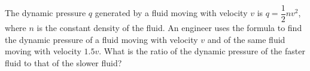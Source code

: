 The dynamic pressure $q$ generated by a fluid moving with velocity $v$ is $q=\dfrac{1}{2}nv^2$, where $n$ is the constant density of the fluid. An engineer uses the formula to find the dynamic pressure of a fluid moving with velocity $v$ and of the same fluid moving with velocity $1.5v$. What is the ratio of the dynamic pressure of the faster fluid to that of the slower fluid?
